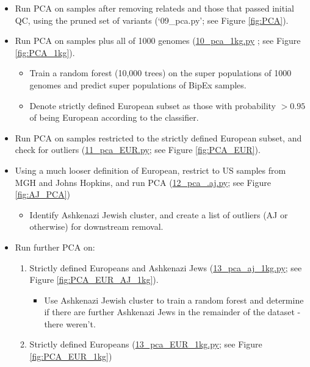 \documentclass[12pt]{article}
\begin{document}
\begin{itemize}
\begin{itemize}
		\end{itemize}
	\item Run PCA on samples after removing relateds and those that passed initial QC, using the pruned set of variants (`09\_pca.py'; see Figure \ref{fig:PCA}).
	\item Run PCA on samples plus all of 1000 genomes (\href{https://github.com/astheeggeggs/BipEx/blob/master/scripts_BipEx/QC_BipEx/10_pca_1kg.py}{10\_pca\_1kg.py} ; see Figure \ref{fig:PCA_1kg}).
	\begin{itemize}
		\item Train a random forest (10,000 trees) on the super populations of 1000 genomes and predict super populations of BipEx samples.
		\item Denote strictly defined European subset as those with probability $> 0.95$ of being European according to the classifier. 
	\end{itemize}
	\item Run PCA on samples restricted to the strictly defined European subset, and check for outliers (\href{https://github.com/astheeggeggs/BipEx/blob/master/scripts_BipEx/QC_BipEx/11_pca_EUR.py}{11\_pca\_EUR.py}; see Figure \ref{fig:PCA_EUR}).
	\item Using a much looser definition of European, restrict to US samples from MGH and Johns Hopkins, and run PCA (\href{https://github.com/astheeggeggs/BipEx/blob/master/scripts_BipEx/QC_BipEx/12_pca_aj.py}{12\_pca\_.aj.py}; see Figure \ref{fig:AJ_PCA})
	\begin{itemize}
		\item Identify Ashkenazi Jewish cluster, and create a list of outliers (AJ or otherwise) for downstream removal.
	\end{itemize}
	\item Run further PCA on:
	\begin{enumerate}
		\item Strictly defined Europeans and Ashkenazi Jews (\href{https://github.com/astheeggeggs/BipEx/blob/master/scripts_BipEx/QC_BipEx/13_pca_aj_1kg.py}{13\_pca\_aj\_1kg.py}; see Figure \ref{fig:PCA_EUR_AJ_1kg}).
		\begin{itemize}
			\item Use Ashkenazi Jewish cluster to train a random forest and determine if there are further Ashkenazi Jews in the remainder of the dataset - there weren't.
		\end{itemize} 
		\item Strictly defined Europeans (\href{https://github.com/astheeggeggs/BipEx/blob/master/scripts_BipEx/QC_BipEx/13_pca_EUR_1kg.py}{13\_pca\_EUR\_1kg.py}; see Figure \ref{fig:PCA_EUR_1kg})

\end{enumerate}
\end{itemize}
\end{document}

